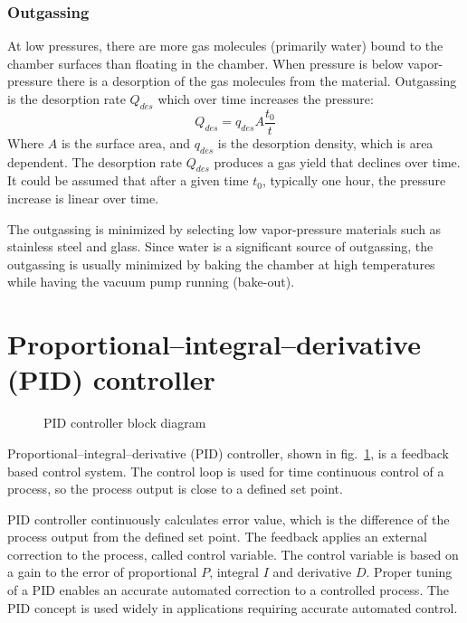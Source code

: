 \documentclass[\main/master.tex]{subfiles}
\begin{document}

\subsubsection{Outgassing}
\par\noindent
At low pressures, there are more gas molecules (primarily water) bound to the chamber surfaces than floating in the chamber. When pressure is below vapor-pressure there is a desorption of the gas molecules from the material. Outgassing is the desorption rate $Q_{des}$ which over time increases the pressure:
\begin{equation}
Q_{des} = q_{des} A\frac{t_0}{t}  \label{eqn:desorption rate}
\end{equation}
Where $A$ is the surface area, and $q_{des}$ is the desorption density, which is area dependent. The desorption rate $Q_{des}$ produces a gas yield that declines over time. It could be assumed that after a given time $t_0$, typically one hour, the pressure increase is linear over time.
\par\noindent
The outgassing is minimized by selecting low vapor-pressure materials such as stainless steel and glass. Since water is a significant source of outgassing, the outgassing is usually minimized by baking the chamber at high temperatures while having the vacuum pump running (bake-out).


\section{Proportional–integral–derivative (PID) controller}
\begin{figure}[htbp]
	\centering
	\caption[PID controller block diagram]{PID controller block diagram}
	\label{fig:PID_scheme}
\end{figure}
\FloatBarrier
\par\noindent
Proportional–integral–derivative (PID) controller, shown in fig.~\ref{fig:PID_scheme}, is a feedback based control system. The control loop is used for time continuous control of a process, so the process output is close to a defined set point.
\par\noindent
PID controller continuously calculates error value, which is the difference of the process output from the defined set point. The feedback applies an external correction to the process, called control variable. The control variable is based on a gain to the error of proportional $P$, integral $I$ and derivative $D$. Proper tuning of a PID enables an accurate automated correction to a controlled process. The PID concept is used widely in applications requiring accurate automated control.
\end{document}
